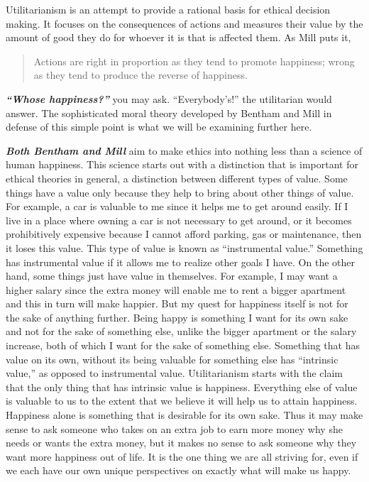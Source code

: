\documentclass[
  12pt, openany]{book}
\theoremstyle{definition}
\theoremstyle{definition}
\theoremstyle{definition}
\theoremstyle{definition}
\theoremstyle{remark}
\begin{document}
Utilitarianism is an attempt to provide a rational basis for ethical decision making. It focuses on the consequences of actions and measures their value by the amount of good they do for whoever it is that is affected them. As Mill puts it,

\begin{quote}
Actions are right in proportion as they tend to promote happiness; wrong as they tend to produce the reverse of happiness.
\end{quote}

\textbf{\emph{``Whose happiness?''}} you may ask. ``Everybody's!'' the utilitarian would answer. The sophisticated moral theory developed by Bentham and Mill in defense of this simple point is what we will be examining further here.

\textbf{\emph{Both Bentham and Mill}} aim to make ethics into nothing less than a science of human happiness. This science starts out with a distinction that is important for ethical theories in general, a distinction between different types of value. Some things have a value only because they help to bring about other things of value. For example, a car is valuable to me since it helps me to get around easily. If I live in a place where owning a car is not necessary to get around, or it becomes prohibitively expensive because I cannot afford parking, gas or maintenance, then it loses this value. This type of value is known as ``instrumental value.'' Something has instrumental value if it allows me to realize other goals I have. On the other hand, some things just have value in themselves. For example, I may want a higher salary since the extra money will enable me to rent a bigger apartment and this in turn will make happier. But my quest for happiness itself is not for the sake of anything further. Being happy is something I want for its own sake and not for the sake of something else, unlike the bigger apartment or the salary increase, both of which I want for the sake of something else. Something that has value on its own, without its being valuable for something else has ``intrinsic value,'' as opposed to instrumental value. Utilitarianism starts with the claim that the only thing that has intrinsic value is happiness. Everything else of value is valuable to us to the extent that we believe it will help us to attain happiness. Happiness alone is something that is desirable for its own sake. Thus it may make sense to ask someone who takes on an extra job to earn more money why she needs or wants the extra money, but it makes no sense to ask someone why they want more happiness out of life. It is the one thing we are all striving for, even if we each have our own unique perspectives on exactly what will make us happy.
\end{document}
